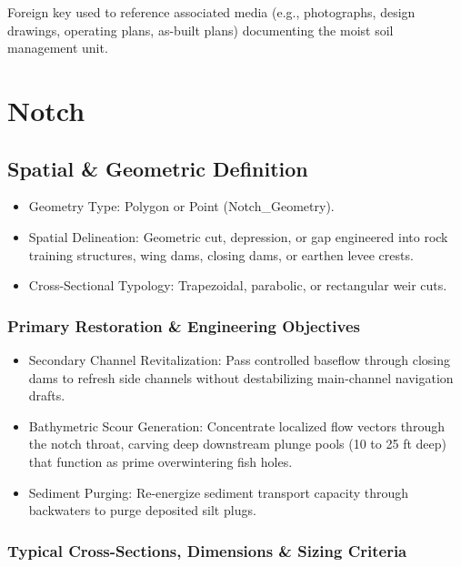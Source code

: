 \documentclass[
  letterpaper,
  DIV=11,
  numbers=noendperiod]{scrreprt}
\begin{document}
Foreign key used to reference associated media (e.g., photographs,
design drawings, operating plans, as-built plans) documenting the moist
soil management unit.

\chapter{Notch}\label{notch}

\section{Spatial \& Geometric
Definition}\label{spatial-geometric-definition-9}

\begin{itemize}
\item
  Geometry Type: Polygon or Point (Notch\_Geometry).
\item
  Spatial Delineation: Geometric cut, depression, or gap engineered into
  rock training structures, wing dams, closing dams, or earthen levee
  crests.
\item
  Cross-Sectional Typology: Trapezoidal, parabolic, or rectangular weir
  cuts.
\end{itemize}

\subsection{Primary Restoration \& Engineering
Objectives}\label{primary-restoration-engineering-objectives-8}

\begin{itemize}
\item
  Secondary Channel Revitalization: Pass controlled baseflow through
  closing dams to refresh side channels without destabilizing
  main-channel navigation drafts.
\item
  Bathymetric Scour Generation: Concentrate localized flow vectors
  through the notch throat, carving deep downstream plunge pools (10 to
  25 ft deep) that function as prime overwintering fish holes.
\item
  Sediment Purging: Re-energize sediment transport capacity through
  backwaters to purge deposited silt plugs.
\end{itemize}

\subsection{Typical Cross-Sections, Dimensions \& Sizing
Criteria}\label{typical-cross-sections-dimensions-sizing-criteria-7}
\end{document}
